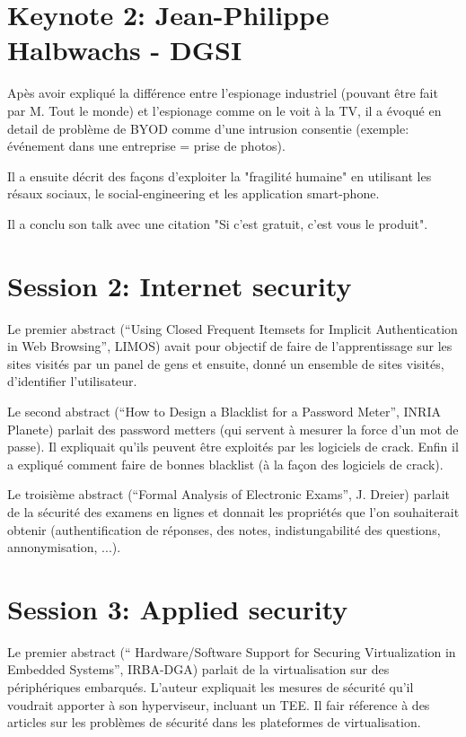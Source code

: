 \documentclass{article}
\begin{document}
\section{Keynote 2: Jean-Philippe Halbwachs - DGSI}

Ap\`es avoir expliqu\'e la diff\'erence entre l'espionage industriel (pouvant \^etre fait par M. Tout le monde) et l'espionage comme on le voit \`a la TV, il a \'evoqu\'e en detail de probl\`eme de BYOD comme d'une intrusion consentie (exemple: \'ev\'enement dans une entreprise = prise de photos).

Il a ensuite d\'ecrit des fa\c cons d'exploiter la "fragilit\'e humaine" en utilisant les r\'esaux sociaux, le social-engineering et les application smart-phone.

Il a conclu son talk avec une citation "Si c'est gratuit, c'est vous le produit".


\section{Session 2: Internet security}

Le premier abstract (``Using Closed Frequent Itemsets for Implicit Authentication in Web Browsing'', LIMOS) avait pour objectif de faire de l'apprentissage sur les sites visit\'es par un panel de gens et ensuite, donn\'e un ensemble de sites visit\'es, d'identifier l'utilisateur.

Le second abstract (``How to Design a Blacklist for a Password Meter'', INRIA Planete) parlait des password metters (qui servent \`a mesurer la force d'un mot de passe). Il expliquait qu'ils peuvent \^etre exploit\'es par les logiciels de crack. Enfin il a expliqu\'e comment faire de bonnes blacklist (\`a la fa\c con des logiciels de crack).

Le troisi\`eme abstract (``Formal Analysis of Electronic Exams'', J. Dreier) parlait de la s\'ecurit\'e des examens en lignes et donnait les propri\'et\'es que l'on souhaiterait obtenir (authentification de r\'eponses, des notes, indistungabilit\'e des questions, annonymisation, ...).


\section{Session 3: Applied security}

Le premier abstract (`` Hardware/Software Support for Securing Virtualization in Embedded Systems'', IRBA-DGA) parlait de la virtualisation sur des p\'eriph\'eriques embarqu\'es. L'auteur expliquait les mesures de s\'ecurit\'e qu'il voudrait apporter \`a son hyperviseur, incluant un TEE. Il fair r\'eference à des articles sur les probl\`emes de s\'ecurit\'e dans les plateformes de virtualisation.
\end{document}
